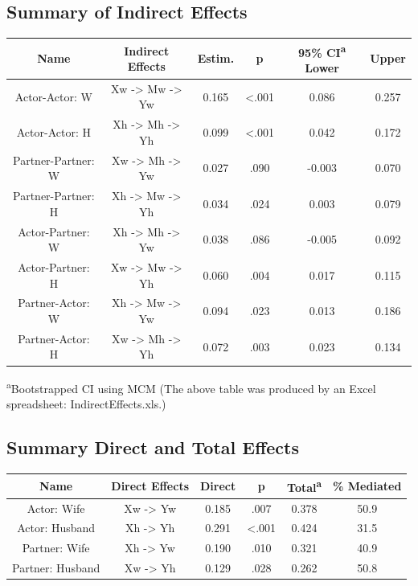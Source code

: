 \documentclass[
  man,floatsintext]{apa6}
\begin{document}
\hypertarget{summary-of-indirect-effects}{%
\subsection{Summary of Indirect Effects}\label{summary-of-indirect-effects}}

\begin{longtable}[]{@{}cccccc@{}}
\toprule
Name & Indirect Effects & Estim. & p & 95\% CI\textsuperscript{a} Lower & Upper \\
\midrule
\endhead
Actor-Actor: W & Xw -\textgreater{} Mw -\textgreater{} Yw & 0.165 & \textless.001 & 0.086 & 0.257 \\
Actor-Actor: H & Xh -\textgreater{} Mh -\textgreater{} Yh & 0.099 & \textless.001 & 0.042 & 0.172 \\
Partner-Partner: W & Xw -\textgreater{} Mh -\textgreater{} Yw & 0.027 & .090 & -0.003 & 0.070 \\
Partner-Partner: H & Xh -\textgreater{} Mw -\textgreater{} Yh & 0.034 & .024 & 0.003 & 0.079 \\
Actor-Partner: W & Xh -\textgreater{} Mh -\textgreater{} Yw & 0.038 & .086 & -0.005 & 0.092 \\
Actor-Partner: H & Xw -\textgreater{} Mw -\textgreater{} Yh & 0.060 & .004 & 0.017 & 0.115 \\
Partner-Actor: W & Xh -\textgreater{} Mw -\textgreater{} Yw & 0.094 & .023 & 0.013 & 0.186 \\
Partner-Actor: H & Xw -\textgreater{} Mh -\textgreater{} Yh & 0.072 & .003 & 0.023 & 0.134 \\
\bottomrule
\end{longtable}

\textsuperscript{a}Bootstrapped CI using MCM
(The above table was produced by an Excel spreadsheet: IndirectEffects.xls.)

\hypertarget{summary-direct-and-total-effects}{%
\subsection{Summary Direct and Total Effects}\label{summary-direct-and-total-effects}}

\begin{longtable}[]{@{}cccccc@{}}
\toprule
Name & Direct Effects & Direct & p & Total\textsuperscript{a} & \% Mediated \\
\midrule
\endhead
Actor: Wife & Xw -\textgreater{} Yw & 0.185 & .007 & 0.378 & 50.9 \\
Actor: Husband & Xh -\textgreater{} Yh & 0.291 & \textless.001 & 0.424 & 31.5 \\
Partner: Wife & Xh -\textgreater{} Yw & 0.190 & .010 & 0.321 & 40.9 \\
Partner: Husband & Xw -\textgreater{} Yh & 0.129 & .028 & 0.262 & 50.8 \\
\bottomrule
\end{longtable}
\end{document}
